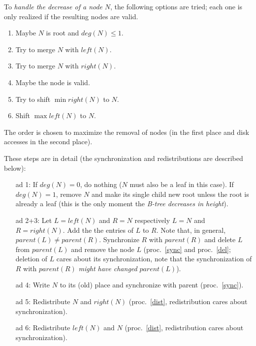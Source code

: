 \documentclass{vldb}
\begin{document}
\begin{proc} \label{dec}
To {\em handle the decrease of a node} $N$, the following options are tried;
each one is only realized if the resulting nodes are valid.
\begin{enumerate}
\item Maybe $N$ is root and \mbox{$deg(N) \leq 1$}.
\item Try to merge $N$ with $left(N)$.
\item Try to merge $N$ with $right(N)$.
\item Maybe the node is valid.
\item Try to shift \mbox{$\min right(N)$} to $N$.
\item Shift \mbox{$\max left(N)$} to $N$.
\end{enumerate}
The order is chosen to maximize the removal of nodes (in the first place and
disk accesses in the second place).

These steps are in detail (the synchronization and redistributions are 
described below):
\begin{itemize}
\item[ad 1:] If \mbox{$deg(N) = 0$}, do nothing ($N$ must also be a leaf in
    this case).
    If \mbox{$deg(N) = 1$}, remove $N$ and make its single child new root
    unless the root is already a leaf (this is the only moment the 
    {\em B-tree decreases in height}).
\item[ad 2+3:] Let \mbox{$L = left(N)$} and \mbox{$R = N$} respectively
    \mbox{$L = N$} and $R = right(N)$.
    Add the the entries of $L$ to $R$.
    Note that, in general, \mbox{$parent(L) \neq parent(R)$}.
    Synchronize $R$ with $parent(R)$ and delete $L$ from $parent(L)$
    and remove the node $L$ 
    (proc.~\ref{sync} and proc.~\ref{del}; deletion of $L$ cares about its
    synchronization, note that the synchronization of $R$ with $parent(R)$
    {\em might have changed} $parent(L)$).
\item[ad 4:] Write $N$ to its (old) place and synchronize with parent
    (proc.~\ref{sync}).
\item[ad 5:] Redistribute $N$ and $right(N)$ (proc.~\ref{dist},
    redistribution cares about synchronization).
\item[ad 6:] Redistribute $left(N)$ and $N$ (proc.~\ref{dist},
    redistribution cares about synchronization).
\end{itemize}
\end{proc}
\end{document}
